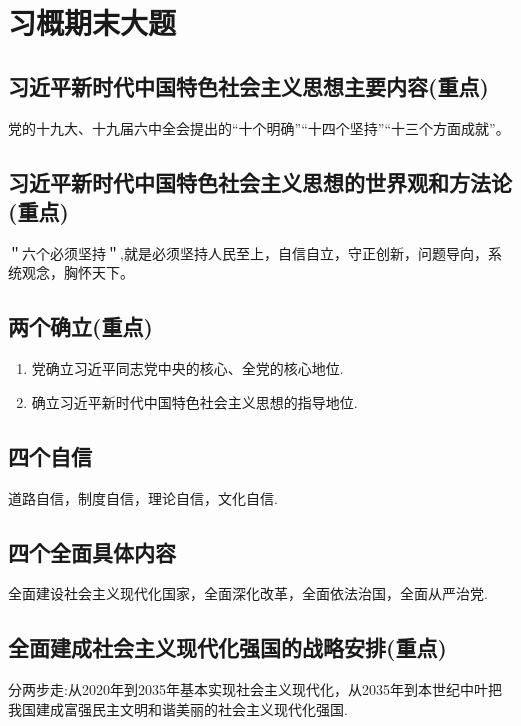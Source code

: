 \documentclass[12pt, a4paper, oneside]{ctexbook}
\begin{document}
\chapter{习概期末大题}

\section{习近平新时代中国特色社会主义思想主要内容(重点)}

党的十九大、十九届六中全会提出的“十个明确”“十四个坚持”“十三个方面成就”。

\section{习近平新时代中国特色社会主义思想的世界观和方法论(重点)}

＂六个必须坚持＂,就是必须坚持人民至上，自信自立，守正创新，问题导向，系统观念，胸怀天下。

\section{两个确立(重点)}

\begin{enumerate}
\item 党确立习近平同志党中央的核心、全党的核心地位. 

\item 确立习近平新时代中国特色社会主义思想的指导地位.
\end{enumerate}

\section{四个自信}

道路自信，制度自信，理论自信，文化自信.


\section{四个全面具体内容}

全面建设社会主义现代化国家，全面深化改革，全面依法治国，全面从严治党.

\section{全面建成社会主义现代化强国的战略安排(重点)}

分两步走:从2020年到2035年基本实现社会主义现代化，从2035年到本世纪中叶把我国建成富强民主文明和谐美丽的社会主义现代化强国.
\end{document}

